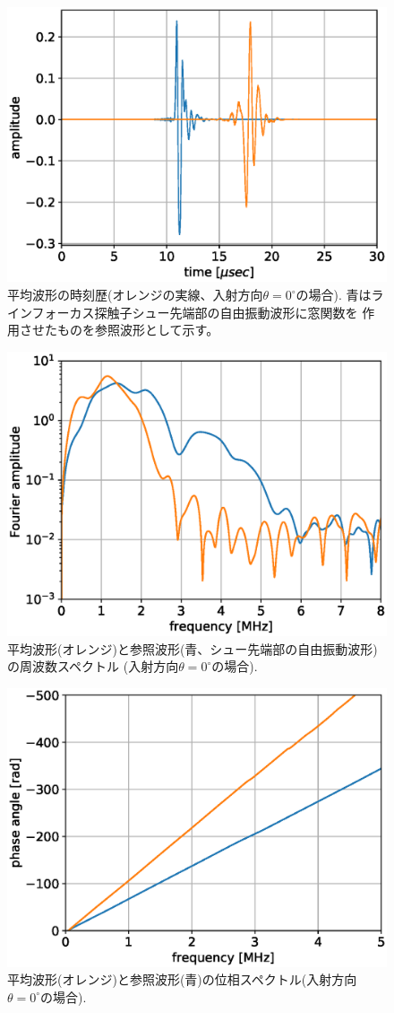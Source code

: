 \begin{figure}[h]
	\begin{center}
	\includegraphics[width=0.6\linewidth]{Figs/fig8.eps} 
	\end{center}
	\caption{
		平均波形の時刻歴(オレンジの実線、入射方向$\theta=0^{\circ}$の場合).
		青はラインフォーカス探触子シュー先端部の自由振動波形に窓関数を
		作用させたものを参照波形として示す。
	} 
	\label{fig:fig8}
\end{figure}
\begin{figure}[h]
	\begin{center}
	\includegraphics[width=0.6\linewidth]{Figs/fig9.eps} 
	\end{center}
	\caption{
		平均波形(オレンジ)と参照波形(青、シュー先端部の自由振動波形)の周波数スペクトル
		(入射方向$\theta=0^{\circ}の場合$).
	} 
	\label{fig:fig9}
\end{figure}
\begin{figure}[h]
	\begin{center}
	\includegraphics[width=0.7\linewidth]{Figs/fig10.eps} 
	\end{center}
	\caption{
		平均波形(オレンジ)と参照波形(青)の位相スペクトル(入射方向$\theta=0^{\circ}$の場合).
	} 
	\label{fig:fig10}
\end{figure}
